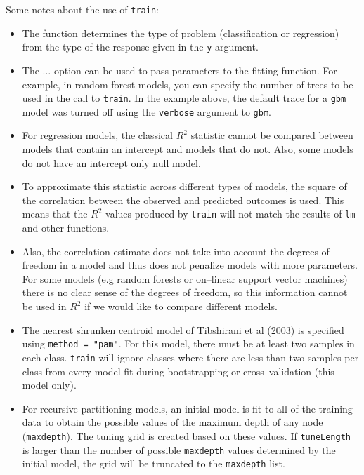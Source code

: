 \documentclass[12pt]{article}
\begin{document}
Some notes about the use of \texttt{train}:
\begin{itemize}
	\item The function determines the type of problem (classification or regression) from the type of the response given in the \texttt{y} argument. 
	
	\item The \texttt{$\ldots$} option can be used to pass parameters to the fitting function. For example, in random forest models, you can specify the number of trees to be used in the call to \texttt{train}. In the example above, the default trace for a \texttt{gbm} model was turned off using the \texttt{verbose} argument to \texttt{gbm}.
	
	\item For regression models, the classical $R^2$ statistic cannot be compared between models that contain an intercept and models that do not. Also, some models do not have an intercept only null model.	
          
          \item [] To approximate this statistic across different types of models,  the square of the correlation between the observed and predicted outcomes is used. This means that the $R^2$ values produced by \texttt{train} will not match the results of \texttt{lm} and other functions. 
            
            \item [] Also, the correlation estimate does not take into account the degrees of freedom in a model and thus does not penalize models with more parameters. For some models (e.g random forests or on--linear support vector machines) there is no clear sense of the degrees of freedom, so this information cannot be used in $R^2$ if we would like to compare different models.
          
	
	\item The nearest shrunken centroid model of \href{http://projecteuclid.org/handle/euclid.ss/1056397488}{Tibshirani et al (2003)} is specified using \texttt{method = "pam"}. For this model, there must be at least two samples in each class. \texttt{train} will ignore classes where there are less than two samples per class from every model fit during bootstrapping or cross--validation (this model only).
	
	\item For recursive partitioning models, an initial model is fit to all of the training data to obtain the possible values of the maximum depth of any node (\texttt{maxdepth}). The tuning grid is created based on these values. If \texttt{tuneLength} is larger than the number of possible \texttt{maxdepth} values determined by the initial model, the grid will be truncated to the  \texttt{maxdepth} list.
	

\end{itemize}
\end{document}
